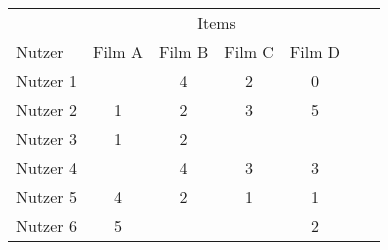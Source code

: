 \begin{tabular}{lcccccc}
    \toprule
    & \multicolumn{4}{c}{Items} \\
    \cmidrule(lr){2-5}
    Nutzer & Film A & Film B & Film C & Film D \\ 
    \midrule
    Nutzer 1 &  & 4 & 2 & 0 \\
    Nutzer 2 & 1 & 2 & 3 & 5 \\
    Nutzer 3 & 1 & 2 &  &  \\
    Nutzer 4 &  & 4 & 3 & 3 \\
    Nutzer 5 & 4 & 2 & 1 & 1 \\
    Nutzer 6 & 5 &  &  & 2 \\
    \bottomrule
\end{tabular}
